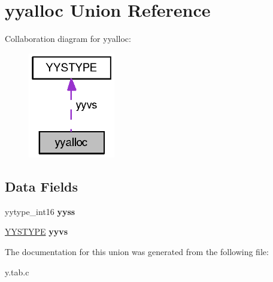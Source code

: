 \hypertarget{unionyyalloc}{
\section{yyalloc Union Reference}
\label{unionyyalloc}
}


Collaboration diagram for yyalloc:\nopagebreak
\begin{figure}[H]
\begin{center}
\leavevmode
\includegraphics[width=107pt]{unionyyalloc__coll__graph}
\end{center}
\end{figure}
\subsection*{Data Fields}
\begin{DoxyCompactItemize}
\item 
\hypertarget{unionyyalloc_aa3c19a8a3172238f9a16ea99f7cf0a85}{
yytype\_\-int16 {\bfseries yyss}}
\label{unionyyalloc_aa3c19a8a3172238f9a16ea99f7cf0a85}

\item 
\hypertarget{unionyyalloc_a8507e56e72dfc653fb4476d234ecce85}{
\hyperlink{union_y_y_s_t_y_p_e}{YYSTYPE} {\bfseries yyvs}}
\label{unionyyalloc_a8507e56e72dfc653fb4476d234ecce85}

\end{DoxyCompactItemize}


The documentation for this union was generated from the following file:\begin{DoxyCompactItemize}
\item 
y.tab.c\end{DoxyCompactItemize}
